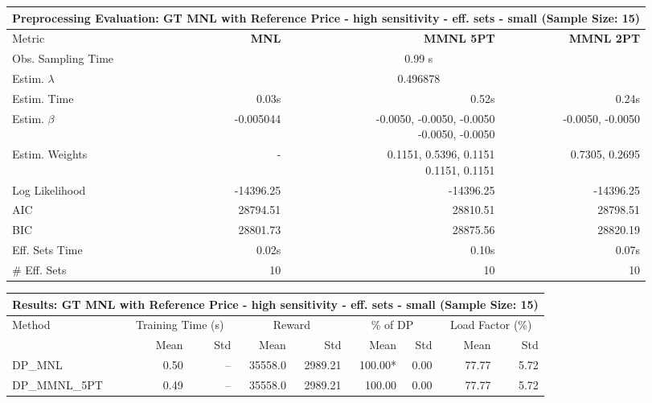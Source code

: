 
\begin{samepage}
\begin{center}
  \small
  \begin{tabular}{l|r|r|r}
    \toprule
    \multicolumn{4}{c}{\textbf{Preprocessing Evaluation: GT MNL with Reference Price - high sensitivity - eff. sets - small (Sample Size: 15)}} \\
    \midrule
    Metric & \textbf{MNL} & \textbf{MMNL 5PT} & \textbf{MMNL 2PT} \\
    \midrule
    Obs. Sampling Time & \multicolumn{3}{c}{0.99 s} \\
    Estim. $\lambda$ & \multicolumn{3}{c}{0.496878} \\
    Estim. Time & 0.03s & 0.52s & 0.24s \\
    Estim. $\beta$ & -0.005044 & \makecell[tr]{-0.0050, -0.0050, -0.0050 \\ -0.0050, -0.0050} & -0.0050, -0.0050 \\
    Estim. Weights & - & \makecell[tr]{0.1151, 0.5396, 0.1151 \\ 0.1151, 0.1151} & 0.7305, 0.2695 \\
    Log Likelihood & -14396.25 & -14396.25 & -14396.25 \\
    AIC & 28794.51 & 28810.51 & 28798.51 \\
    BIC & 28801.73 & 28875.56 & 28820.19 \\
    Eff. Sets Time & 0.02s & 0.10s & 0.07s \\
    \# Eff. Sets & 10 & 10 & 10 \\
    \bottomrule
  \end{tabular}
\end{center}
\begin{center}
  \small
  \begin{tabular}{l|rr|rr|rr|rr}
    \toprule
    \multicolumn{9}{c}{\textbf{Results: GT MNL with Reference Price - high sensitivity - eff. sets - small (Sample Size: 15)}} \\
    \midrule
    Method & \multicolumn{2}{c|}{Training Time (s)} & \multicolumn{2}{c|}{Reward} & \multicolumn{2}{c|}{\% of DP} & \multicolumn{2}{c}{Load Factor (\%)} \\
    & Mean & Std & Mean & Std & Mean & Std & Mean & Std \\
    \midrule
    DP\_MNL      &     0.50 &    -- &    35558.0 &    2989.21 & 100.00* &    0.00 &   77.77 &    5.72 \\
    DP\_MMNL\_5PT &     0.49 &    -- &    35558.0 &    2989.21 &  100.00 &    0.00 &   77.77 &    5.72 \\

\end{tabular}
\end{center}
\end{samepage}
